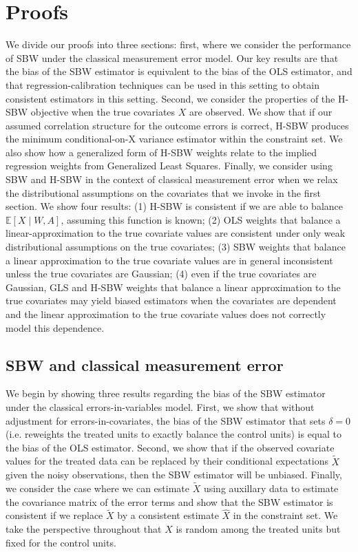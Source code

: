 \section{Proofs}\label{ssec:proof}

We divide our proofs into three sections: first, where we consider the performance of SBW under the classical measurement error model. Our key results are that the bias of the SBW estimator is equivalent to the bias of the OLS estimator, and that regression-calibration techniques can be used in this setting to obtain consistent estimators in this setting. Second, we consider the properties of the H-SBW objective when the true covariates $X$ are observed. We show that if our assumed correlation structure for the outcome errors is correct, H-SBW produces the minimum conditional-on-X variance estimator within the constraint set. We also show how a generalized form of H-SBW weights relate to the implied regression weights from Generalized Least Squares. Finally, we consider using SBW and H-SBW in the context of classical measurement error when we relax the distributional assumptions on the covariates that we invoke in the first section. We show four results: (1) H-SBW is consistent if we are able to balance $\mathbb{E}[X \mid W, A]$, assuming this function is known; (2) OLS weights that balance a linear-approximation to the true covariate values are consistent under only weak distributional assumptions on the true covariates; (3) SBW weights that balance a linear approximation to the true covariate values are in general inconsistent unless the true covariates are Gaussian; (4) even if the true covariates are Gaussian, GLS and H-SBW weights that balance a linear approximation to the true covariates may yield biased estimators when the covariates are dependent and the linear approximation to the true covariate values does not correctly model this dependence.

\subsection{SBW and classical measurement error}\label{app:AsecI}

We begin by showing three results regarding the bias of the SBW estimator under the classical errors-in-variables model. First, we show that without adjustment for errors-in-covariates, the bias of the SBW estimator that sets $\delta = 0$ (i.e. reweights the treated units to exactly balance the control units) is equal to the bias of the OLS estimator. Second, we show that if the observed covariate values for the treated data can be replaced by their conditional expectations $\tilde{X}$ given the noisy observations, then the SBW estimator will be unbiased. Finally, we consider the case where we can estimate $\tilde{X}$ using auxillary data to estimate the covariance matrix of the error terms and show that the SBW estimator is consistent if we replace $\tilde{X}$ by a consistent estimate $\hat{X}$ in the constraint set. We take the perspective throughout that $X$ is random among the treated units but fixed for the control units.

